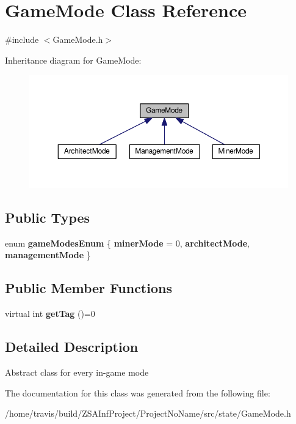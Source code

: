 \hypertarget{classGameMode}{\section{Game\-Mode Class Reference}
\label{classGameMode}
}


{\ttfamily \#include $<$Game\-Mode.\-h$>$}



Inheritance diagram for Game\-Mode\-:
\nopagebreak
\begin{figure}[H]
\begin{center}
\leavevmode
\includegraphics[width=350pt]{classGameMode__inherit__graph}
\end{center}
\end{figure}
\subsection*{Public Types}
\begin{DoxyCompactItemize}
\item 
enum {\bfseries game\-Modes\-Enum} \{ {\bfseries miner\-Mode} = 0, 
{\bfseries architect\-Mode}, 
{\bfseries management\-Mode}
 \}
\end{DoxyCompactItemize}
\subsection*{Public Member Functions}
\begin{DoxyCompactItemize}
\item 
\hypertarget{classGameMode_ad65efbdca81be42e3528ee08e1a1657b}{virtual int {\bfseries get\-Tag} ()=0}\label{classGameMode_ad65efbdca81be42e3528ee08e1a1657b}

\end{DoxyCompactItemize}


\subsection{Detailed Description}
Abstract class for every in-\/game mode 

The documentation for this class was generated from the following file\-:\begin{DoxyCompactItemize}
\item 
/home/travis/build/\-Z\-S\-A\-Inf\-Project/\-Project\-No\-Name/src/state/Game\-Mode.\-h\end{DoxyCompactItemize}
